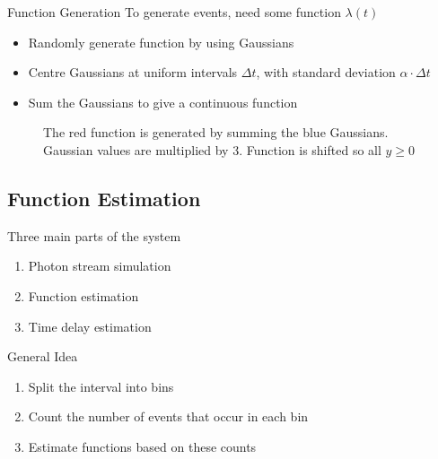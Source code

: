 \documentclass{beamer}
\begin{document}
\begin{frame}{Function Generation}
  To generate events, need some function $\lambda(t)$
  \begin{itemize}[<+->]
  \item Randomly generate function by using Gaussians
  \item Centre Gaussians at uniform intervals $\Delta t$, with standard
    deviation $\alpha \cdot \Delta t$
  \item Sum the Gaussians to give a continuous function
  \end{itemize}
\end{frame}

\begin{frame}[label=gauss]
  \begin{figure}
    \centering
    \caption{The red function is generated by summing the blue Gaussians. Gaussian values are multiplied by 3. Function is shifted so
      all $y\geq 0$}
  \end{figure}
\end{frame}

\subsection{Function Estimation}

\begin{frame}
  Three main parts of the system
  \begin{enumerate}
  \item Photon stream simulation
  \item \alert{Function estimation}
  \item Time delay estimation
  \end{enumerate}
\end{frame}

\begin{frame}{General Idea}
  \begin{enumerate}
  \item Split the interval into bins
  \item Count the number of events that occur in each bin
  \item Estimate functions based on these counts
  \end{enumerate}
\end{frame}
\end{document}
